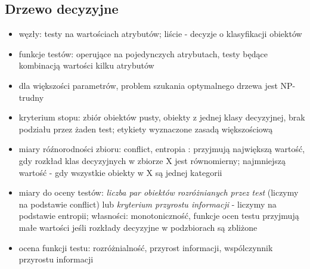 \documentclass[10pt,a4paper]{article}
\begin{document}
\subsection{Drzewo decyzyjne}
\begin{itemize}
  \item węzły: testy na wartościach atrybutów; liście - decyzje o klasyfikacji obiektów
  \item funkcje testów: operujące na pojedynczych atrybutach, testy będące kombinacją wartości kilku atrybutów
  \item dla większości parametrów, problem szukania optymalnego drzewa jest NP-trudny
  \item kryterium stopu: zbiór obiektów pusty, obiekty z jednej klasy decyzyjnej, brak podziału przez żaden test; etykiety wyznaczone zasadą większościową
  \item miary róźnorodności zbioru: conflict, entropia : przyjmują największą wartość, gdy rozkład klas decyzyjnych w zbiorze X jest równomierny; najmniejszą wartość - gdy wszystkie obiekty w X są jednej kategorii
  \item miary do oceny testów: \textit{liczba par obiektów rozróżnianych przez test } (liczymy na podstawie conflict) lub \textit{kryterium przyrostu informacji} - liczymy na podstawie entropii; własności: monotoniczność, funkcje ocen testu przyjmują małe wartości jeśli rozkłady decyzyjne w podzbiorach są zbliżone
  \item ocena funkcji testu: rozróżnialność, przyrost informacji, wspólczynnik przyrostu informacji
\end{itemize}
\end{document}
